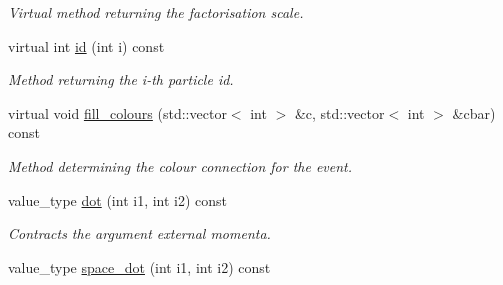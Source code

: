 \begin{DoxyCompactItemize}
\begin{DoxyCompactList}\small\item\em Virtual method returning the factorisation scale. \end{DoxyCompactList}\item 
\hypertarget{a00442_a81a3eb4bfad1738c2a49c110d41e5c2a}{virtual int \hyperlink{a00442_a81a3eb4bfad1738c2a49c110d41e5c2a}{id} (int i) const }\label{a00442_a81a3eb4bfad1738c2a49c110d41e5c2a}

\begin{DoxyCompactList}\small\item\em Method returning the i-\/th particle id. \end{DoxyCompactList}\item 
\hypertarget{a00442_ae14bedd0a3ecec9e2c1509faeab471f6}{virtual void \hyperlink{a00442_ae14bedd0a3ecec9e2c1509faeab471f6}{fill\-\_\-colours} (std\-::vector$<$ int $>$ \&c, std\-::vector$<$ int $>$ \&cbar) const }\label{a00442_ae14bedd0a3ecec9e2c1509faeab471f6}

\begin{DoxyCompactList}\small\item\em Method determining the colour connection for the event. \end{DoxyCompactList}\item 
\hypertarget{a00442_a35962c48138ddc39e0316fbba1422583}{value\-\_\-type \hyperlink{a00442_a35962c48138ddc39e0316fbba1422583}{dot} (int i1, int i2) const }\label{a00442_a35962c48138ddc39e0316fbba1422583}

\begin{DoxyCompactList}\small\item\em Contracts the argument external momenta. \end{DoxyCompactList}\item 
\hypertarget{a00442_aaf3de6e8effefc030367eaa67a15c0dd}{value\-\_\-type \hyperlink{a00442_aaf3de6e8effefc030367eaa67a15c0dd}{space\-\_\-dot} (int i1, int i2) const }\label{a00442_aaf3de6e8effefc030367eaa67a15c0dd}


\end{DoxyCompactItemize}
